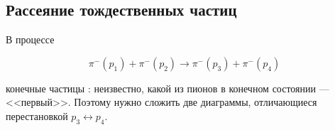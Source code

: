 \documentclass[../final.tex]{subfiles}
\begin{document}
\subsection{Рассеяние тождественных частиц}

В процессе

\begin{equation*}
    \pi^-(p_1)+\pi^-(p_2)\rightarrow\pi^-(p_3)+\pi^-(p_4)
\end{equation*}

конечные частицы : неизвестно, какой
из пионов в конечном состоянии --- <<первый>>. Поэтому нужно
сложить две диаграммы, отличающиеся перестановкой $p_3\leftrightarrow p_4$.
\end{document}
